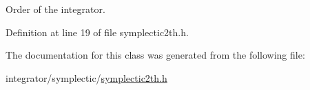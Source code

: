 Order of the integrator. 



Definition at line 19 of file symplectic2th.\+h.



The documentation for this class was generated from the following file\+:\begin{DoxyCompactItemize}
\item 
integrator/symplectic/\mbox{\hyperlink{symplectic2th_8h}{symplectic2th.\+h}}\end{DoxyCompactItemize}
